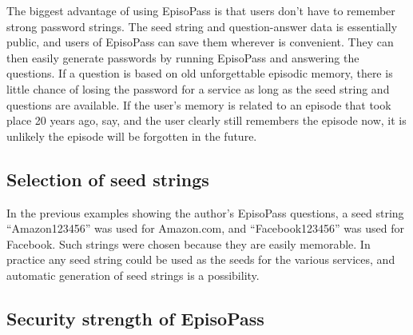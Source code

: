 \documentclass[runningheads,a4paper]{llncs}
\begin{document}

The biggest advantage of using EpisoPass is that
users don't have to remember strong password strings.
%
The seed string and question-answer data is essentially public,
and users of EpisoPass can save them wherever is convenient. They can
then easily generate passwords by running
EpisoPass and answering the questions.
If a question is based on old unforgettable episodic memory,
there is little chance of losing the password for a service
as long as the seed string and questions are available.
If the user's memory is related to an episode that took place 20 years ago, say, and the user clearly
still remembers the episode now, it is unlikely the episode will be forgotten in the future.

\subsection{Selection of seed strings}


In the previous examples showing the author's EpisoPass questions,
a seed string ``\textsf{Amazon123456}'' was used for Amazon.com, and
``\textsf{Facebook123456}'' was used for Facebook.
Such strings were chosen because they are easily memorable.
In practice any seed string could be used as the seeds for the various services,
and automatic generation of seed strings is a possibility.


\subsection{Security strength of EpisoPass}
\end{document}
